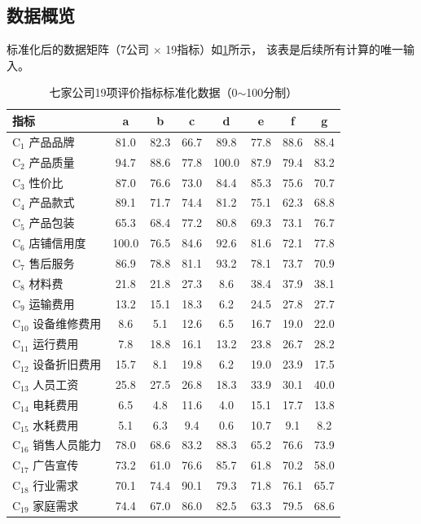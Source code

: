 \documentclass[a4paper,12pt]{ctexart}
\begin{document}
\subsection{数据概览}

标准化后的数据矩阵（7公司 $\times$ 19指标）如\cref{tab:rawdata}所示，
该表是后续所有计算的唯一输入。

\begin{table}[H]
\centering
\caption{七家公司19项评价指标标准化数据（0$\sim$100分制）}
\label{tab:rawdata}
\scriptsize
\begin{tabular}{lccccccc}
\toprule
指标 & a & b & c & d & e & f & g \\
\midrule
C$_1$ 产品品牌      & 81.0 & 82.3 & 66.7 & 89.8 & 77.8 & 88.6 & 88.4 \\
C$_2$ 产品质量      & 94.7 & 88.6 & 77.8 & 100.0& 87.9 & 79.4 & 83.2 \\
C$_3$ 性价比        & 87.0 & 76.6 & 73.0 & 84.4 & 85.3 & 75.6 & 70.7 \\
C$_4$ 产品款式      & 89.1 & 71.7 & 74.4 & 81.2 & 75.1 & 62.3 & 68.8 \\
C$_5$ 产品包装      & 65.3 & 68.4 & 77.2 & 80.8 & 69.3 & 73.1 & 76.7 \\
C$_6$ 店铺信用度    & 100.0& 76.5 & 84.6 & 92.6 & 81.6 & 72.1 & 77.8 \\
C$_7$ 售后服务      & 86.9 & 78.8 & 81.1 & 93.2 & 78.1 & 73.7 & 70.9 \\
C$_8$ 材料费        & 21.8 & 21.8 & 27.3 & 8.6  & 38.4 & 37.9 & 38.1 \\
C$_9$ 运输费用      & 13.2 & 15.1 & 18.3 & 6.2  & 24.5 & 27.8 & 27.7 \\
C$_{10}$ 设备维修费用& 8.6  & 5.1  & 12.6 & 6.5  & 16.7 & 19.0 & 22.0 \\
C$_{11}$ 运行费用    & 7.8  & 18.8 & 16.1 & 13.2 & 23.8 & 26.7 & 28.2 \\
C$_{12}$ 设备折旧费用& 15.7 & 8.1  & 19.8 & 6.2  & 19.0 & 23.9 & 17.5 \\
C$_{13}$ 人员工资    & 25.8 & 27.5 & 26.8 & 18.3 & 33.9 & 30.1 & 40.0 \\
C$_{14}$ 电耗费用    & 6.5  & 4.8  & 11.6 & 4.0  & 15.1 & 17.7 & 13.8 \\
C$_{15}$ 水耗费用    & 5.1  & 6.3  & 9.4  & 0.6  & 10.7 & 9.1  & 8.2  \\
C$_{16}$ 销售人员能力& 78.0 & 68.6 & 83.2 & 88.3 & 65.2 & 76.6 & 73.9 \\
C$_{17}$ 广告宣传    & 73.2 & 61.0 & 76.6 & 85.7 & 61.8 & 70.2 & 58.0 \\
C$_{18}$ 行业需求    & 70.1 & 74.4 & 90.1 & 79.3 & 71.8 & 76.1 & 65.7 \\
C$_{19}$ 家庭需求    & 74.4 & 67.0 & 86.0 & 82.5 & 63.3 & 79.5 & 68.6 \\
\bottomrule
\end{tabular}
\end{table}
\end{document}

